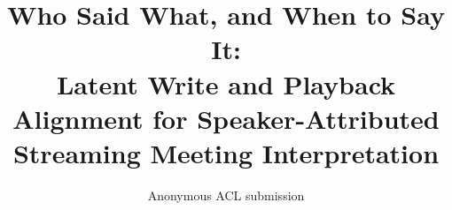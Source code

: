 \documentclass[11pt]{article}
\title{Who Said What, and When to Say It:\\
Latent Write and Playback Alignment for Speaker-Attributed Streaming Meeting Interpretation}
\author{Anonymous ACL submission}
\begin{document}
\maketitle











\appendix
\makeatletter
\renewcommand{\thesection}{\ifnum\c@section>26 A\@Alph{\numexpr\c@section-26\relax}\else\@Alph{\c@section}\fi}
\makeatother


\end{document}
